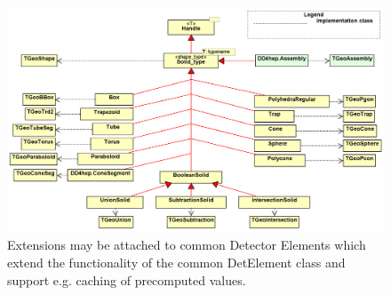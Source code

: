 \documentclass[10pt,a4paper]{article}
\begin{document}
\newpage
\begin{figure}[t]
  \begin{center}
    \includegraphics[width=160mm] {DD4hep-solids}
    \caption{Extensions may be attached to common Detector Elements which 
             extend the functionality of the common DetElement 
             class and support e.g. caching of precomputed values.}
    \label{fig:dd4hep-solids}
  \end{center}
  \vspace{-0.6cm}
\end{figure}
\end{document}
